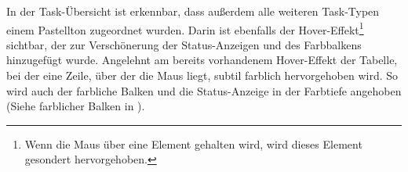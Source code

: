 In der Task-Übersicht ist erkennbar, dass außerdem alle weiteren Task-Typen einem Pastellton zugeordnet wurden. Darin ist
ebenfalls der Hover-Effekt\footnote{Wenn die Maus über eine Element gehalten wird, wird dieses Element gesondert hervorgehoben.}
sichtbar, der zur Verschönerung der Status-Anzeigen und des Farbbalkens hinzugefügt wurde.
Angelehnt am bereits vorhandenem Hover-Effekt der Tabelle, bei der eine Zeile, über der die Maus liegt, subtil farblich
hervorgehoben wird. So wird auch der farbliche Balken und die Status-Anzeige in der Farbtiefe angehoben (Siehe farblicher Balken
in ).

